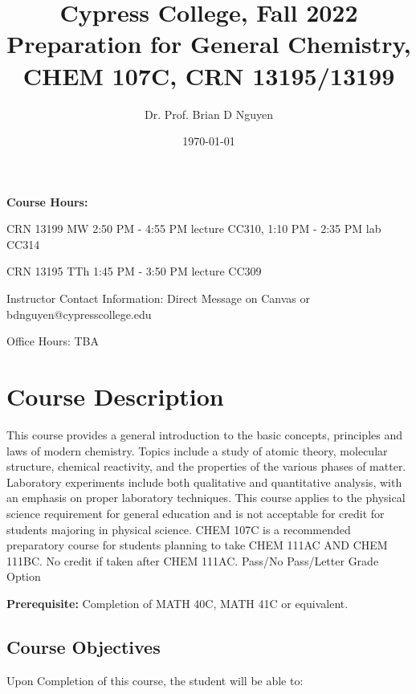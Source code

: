 \documentclass[11pt]{article}
\title{\textbf{Cypress College, Fall 2022 \\
    Preparation for General Chemistry, CHEM 107C, CRN 13195/13199}}
\author{Dr. Prof. Brian D Nguyen}
\date{\today}
\begin{document}
\maketitle 

\textbf{Course Hours:}

CRN 13199 MW 2:50 PM - 4:55 PM lecture CC310, 1:10 PM - 2:35 PM lab CC314

CRN 13195 TTh 1:45 PM - 3:50 PM lecture CC309

Instructor Contact Information: Direct Message on Canvas or bdnguyen@cypresscollege.edu

Office Hours: TBA

\section{Course Description}
This course provides a general introduction to the basic concepts, principles and laws
of modern chemistry. Topics include a study of atomic theory, molecular structure,
chemical reactivity, and the properties of the various phases of matter. Laboratory
experiments include both qualitative and quantitative analysis, with an emphasis on
proper laboratory techniques. This course applies to the physical science requirement
for general education and is not acceptable for credit for students majoring in physical
science. CHEM 107C is a recommended preparatory course for students planning to take
CHEM 111AC AND CHEM 111BC. No credit if taken after CHEM 111AC. Pass/No Pass/Letter
Grade Option

\textbf{Prerequisite:}  Completion of MATH 40C, MATH 41C or equivalent.

\subsection{Course Objectives}
Upon Completion of this course, the student will be able to:
\end{document}
